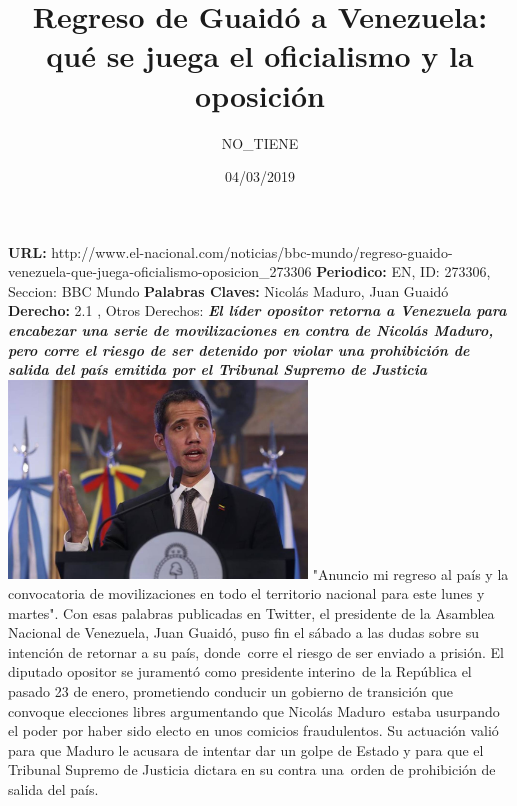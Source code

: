 \documentclass{article}%
\title{\textbf{Regreso de Guaidó a Venezuela: qué se juega el oficialismo y la oposición}}%
\author{NO\_TIENE}%
\date{04/03/2019}%
\begin{document}
%
\normalsize%
\maketitle%
\textbf{URL: }%
http://www.el{-}nacional.com/noticias/bbc{-}mundo/regreso{-}guaido{-}venezuela{-}que{-}juega{-}oficialismo{-}oposicion\_273306\newline%
%
\textbf{Periodico: }%
EN, %
ID: %
273306, %
Seccion: %
BBC Mundo\newline%
%
\textbf{Palabras Claves: }%
Nicolás Maduro, Juan Guaidó\newline%
%
\textbf{Derecho: }%
2.1%
, Otros Derechos: %
\newline%
%
\textbf{\textit{El líder opositor retorna a Venezuela para encabezar una serie de movilizaciones en contra de Nicolás Maduro, pero corre el riesgo de ser detenido por violar una prohibición de salida del país emitida por el Tribunal Supremo de Justicia}}%
\newline%
\newline%
%
\includegraphics[width=300px]{EN_273306.jpg}%
\newline%
%
"Anuncio mi regreso al país y la convocatoria de movilizaciones en todo el territorio nacional para este lunes y martes".%
\newline%
%
Con esas palabras publicadas en Twitter, el presidente de la Asamblea Nacional de Venezuela, Juan Guaidó, puso fin el sábado a las dudas sobre su intención de retornar a su país, donde~corre el riesgo de ser enviado a prisión.%
\newline%
%
El diputado opositor se juramentó como presidente interino~de la República el pasado 23 de enero, prometiendo conducir un gobierno de transición que convoque elecciones libres argumentando que Nicolás Maduro~estaba usurpando el poder por haber sido electo en unos comicios fraudulentos.%
\newline%
%
Su actuación valió para que Maduro le acusara de intentar dar un golpe de Estado y para que el Tribunal Supremo de Justicia dictara en su contra una~orden de prohibición de salida del país.%
\end{document}
